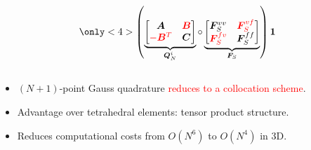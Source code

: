 \documentclass[compress]{beamer}
\theoremstyle{plain}
\newcommand{\LRp}[1]{\left( #1 \right)}
\renewcommand{\note}[1]{\textcolor{red}{{#1}}}
\begin{document}
{\begin{columns}
\begin{column}{.51\textwidth}
\[{}
\only<4>{
\LRp{\underbrace{\begin{bmatrix}
\bm{A} & \note{\bm{B}}\\
\note{-\bm{B}^T} & \bm{C}
\end{bmatrix}}_{\bm{Q}_N^i} \circ
\underbrace{\begin{bmatrix}
\bm{F}^{vv}_S & \note{\bm{F}^{vf}_S}\\
\note{\bm{F}^{fv}_S} & \bm{F}^{ff}_S
\end{bmatrix}}_{\bm{F}_S} } \bm{1}
}
\]
\end{column}
\end{columns}
\vspace{.5em}
\begin{itemize}
\item $(N+1)$-point Gauss quadrature \note{reduces to a collocation scheme}.  
\vspace{.5em}
\item Advantage over tetrahedral elements: tensor product structure.
\vspace{.5em}
\item Reduces computational costs from $O(N^6)$ to $O(N^4)$ in 3D.
\vspace{.5em}
\end{itemize} 
}
\end{document}
